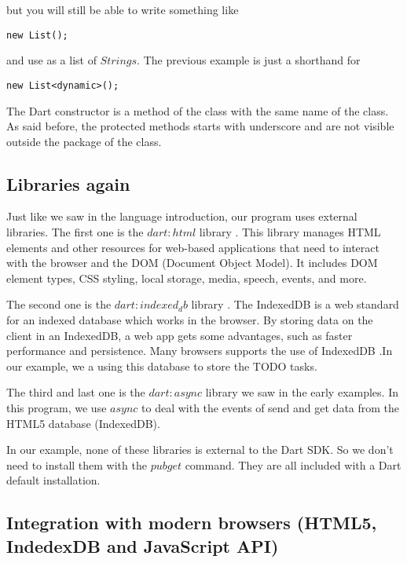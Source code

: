 but you will still be able to write something like

\begin{verbatim}
new List();
\end{verbatim}

and use as a list of $Strings$. The previous example is just a shorthand for

\begin{verbatim}
new List<dynamic>();
\end{verbatim}

The Dart constructor is a method of the class with the same name of the class.
As said before, the protected methods starts with underscore and are not visible
outside the package of the class.

\subsection{Libraries again}

Just like we saw in the language introduction, our program uses external
libraries. The first one is the $dart:html$
library \cite{4_3}. This library manages HTML
elements and other resources for web-based applications that need to interact
with the browser and the DOM (Document Object Model). It includes DOM element
types, CSS styling, local storage, media, speech, events, and more.

The second one is the $dart:indexed_db$
library \cite{4_4}. The IndexedDB is a web
standard for an indexed database which works in the browser. By storing data on
the client in an IndexedDB, a web app gets some advantages, such as faster
performance and persistence. Many browsers supports the use of
IndexedDB \cite{4_5}.In our example, we a using
this database to store the TODO tasks.

The third and last one is the $dart:async$
library \cite{4_6} we saw in the early
examples. In this program, we use $async$ to deal with the events of send
and get data from the HTML5 database (IndexedDB).

In our example, none of these libraries is external to the Dart SDK. So we don't
need to install them with the $pub get$ command. They are all included with a
Dart default installation.

\subsection{Integration with modern browsers (HTML5, IndedexDB and JavaScript API)}

